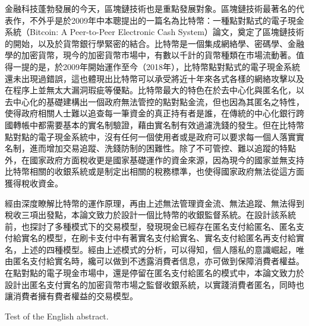 \begin{cabstract}

	金融科技蓬勃發展的今天，區塊鏈技術也是重點發展對象。區塊鏈技術最著名的代表作，不外乎是於2009年中本聰提出的一篇名為比特幣：一種點對點式的電子現金系統（Bitcoin: A Peer-to-Peer Electronic Cash System）論文\parencite{bitcoinpaper}，奠定了區塊鏈技術的開始，以及於貨幣銀行學緊密的結合。比特幣是一個集成網絡學、密碼學、金融學的加密貨幣，現今的加密貨幣市場中，有數以千計的貨幣種類在市場流動著。值得一提的是，於2009年開始運作至今（2018年），比特幣點對點式的電子現金系統還未出現過錯誤，這也體現出比特幣可以承受將近十年來各式各樣的網絡攻擊以及在程序上並無太⼤漏洞瑕疵等優點。比特幣最大的特色在於去中心化與匿名化，以去中⼼化的基礎建構出⼀個政府無法管控的點對點⾦流，但也因為其匿名之特性，使得政府相關人⼠難以追查每⼀筆資⾦的真正持有者是誰，在傳統的中心化銀行跨國轉帳中都需要基本的實名制驗證，藉由實名制有效過濾洗錢的發生。但在比特幣點對點的電子現金系統中，沒有任何一個使用者或是政府可以要求每一個人落實實名制，進而增加交易追蹤、洗錢防制的困難性。除了不可管控、難以追蹤的特點外，在國家政府方面稅收更是國家基礎運作的資⾦來源，因為現今的國家並無支持比特幣相關的收銀系統或是制定出相關的稅務標準，也使得國家政府無法從這方面獲得稅收資金。

	經由深度瞭解比特幣的運作原理，再由上述無法管理資金流、無法追蹤、無法得到稅收三項出發點，本論文致力於設計一個比特幣的收銀監督系統。在設計該系統前，也探討了多種模式下的交易模型，發現現金已經存在匿名支付給匿名、匿名支付給實名的模型，在刷卡支付中有著實名支付給實名、實名支付給匿名再支付給實名，上述的四種模型。經由上述模式的分析，可以得知，個人隱私的意識崛起，唯由匿名支付給實名時，纔可以做到不透露消費者信息，亦可做到保障消費者權益。在點對點的電子現金市場中，還是停留在匿名支付給匿名的模式中，本論⽂致⼒於設計出匿名⽀付實名的加密貨幣市場之監督收銀系統，以實踐消費者匿名，同時也讓消費者擁有費者權益的交易模型。
\end{cabstract}

\begin{eabstract}
	Test of the English abstract.
\end{eabstract}

